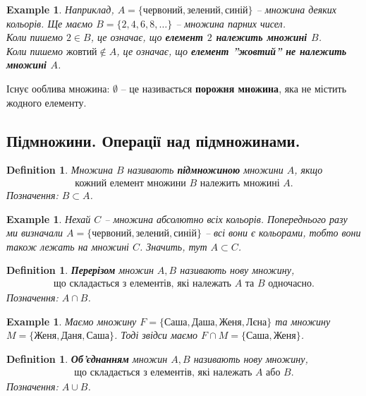 \documentclass[a4paper, 10pt]{article}
\theoremstyle{theoremdd}
\theoremstyle{theoremdd}
\newtheorem{definition}[theorem]{Definition}
\theoremstyle{theoremdd}
\theoremstyle{theoremdd}
\newtheorem{example}[theorem]{Example}
\theoremstyle{theoremdd}
\theoremstyle{theoremdd}
\theoremstyle{theoremdd}
\theoremstyle{theoremdd}
\begin{document}
\begin{example}
Наприклад, $A = \{ \textit{червоний}, \textit{зелений}, \textit{синій} \}$ -- множина деяких кольорів. Ще маємо $B = \{2,4,6,8,\dots\}$ -- множина парних чисел.\\
Коли пишемо $2 \in B$, це означає, що \textbf{елемент $2$ належить множині $B$}.\\
Коли пишемо $\textit{жовтий} \notin A$, це означає, що \textbf{елемент ''жовтий'' не належить множині $A$}.
\end{example}

Існує ооблива множина: $\emptyset$ -- це називається \textbf{порожня множина}, яка не містить жодного елементу.

\subsection{Підмножини. Операції над підмножинами.}
\begin{definition}
Множина $B$ називають \textbf{підмножиною} множини $A$, якщо 
\begin{align*}
\text{кожний елемент множини $B$ належить множині $A$.}
\end{align*}
Позначення: $B \subset A$.
\end{definition}

\begin{example}
Нехай $C$ -- множина абсолютно всіх кольорів. Попереднього разу ми визначали $A = \{ \text{червоний}, \text{зелений}, \text{синій} \}$ -- всі вони є кольорами, тобто вони також лежать на множині $C$. Значить, тут $A \subset C$.
\end{example}

\begin{definition}
\textbf{Перерізом} множин $A,B$ називають нову множину,
\begin{align*}
\text{що складається з елементів, які належать $A$ та $B$ одночасно.}
\end{align*}
Позначення: $A \cap B$.
\end{definition}

\begin{example}
Маємо множину $F = \{\text{Саша}, \text{Даша}, \text{Женя}, \text{Лєна}\}$ та множину $M = \{\text{Женя}, \text{Даня}, \text{Саша}\}$. Тоді звідси маємо $F \cap M = \{\text{Саша}, \text{Женя}\}$.
\end{example}

\begin{definition}
\textbf{Об'єднанням} множин $A,B$ називають нову множину, 
\begin{align*}
\text{що складається з елементів, які належать $A$ або $B$.}
\end{align*}
Позначення: $A \cup B$.
\end{definition}
\end{document}
